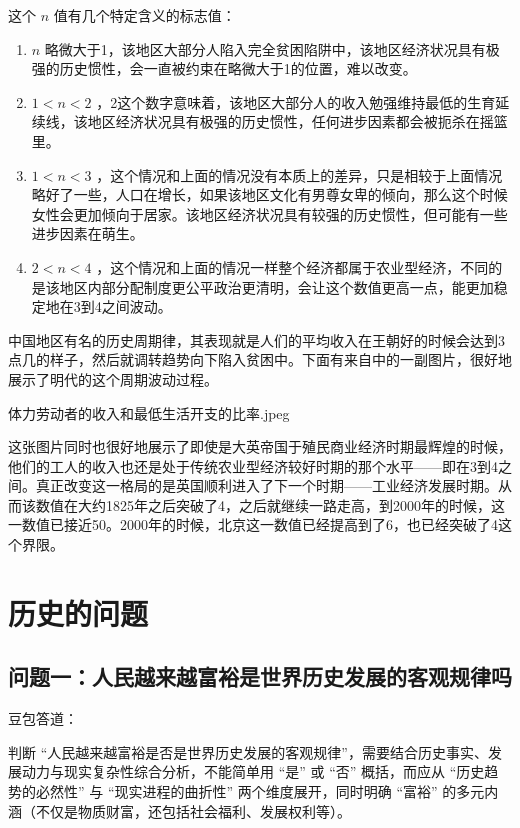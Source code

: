 \documentclass[12pt,oneside]{book}
\begin{document}
这个 $ n $ 值有几个特定含义的标志值：

\begin{enumerate}
\item $ n $ 略微大于1，该地区大部分人陷入完全贫困陷阱中，该地区经济状况具有极强的历史惯性，会一直被约束在略微大于1的位置，难以改变。
\item $ 1< n < 2 $ ，2这个数字意味着，该地区大部分人的收入勉强维持最低的生育延续线，该地区经济状况具有极强的历史惯性，任何进步因素都会被扼杀在摇篮里。
\item $ 1< n < 3 $ ，这个情况和上面的情况没有本质上的差异，只是相较于上面情况略好了一些，人口在增长，如果该地区文化有男尊女卑的倾向，那么这个时候女性会更加倾向于居家。该地区经济状况具有较强的历史惯性，但可能有一些进步因素在萌生。
\item $ 2 <n < 4$ ，这个情况和上面的情况一样整个经济都属于农业型经济，不同的是该地区内部分配制度更公平政治更清明，会让这个数值更高一点，能更加稳定地在3到4之间波动。
\end{enumerate}


中国地区有名的历史周期律，其表现就是人们的平均收入在王朝好的时候会达到3点几的样子，然后就调转趋势向下陷入贫困中。下面有来自\cite{全球经济史}中的一副图片，很好地展示了明代的这个周期波动过程。

\begin{linefig}{体力劳动者的收入和最低生活开支的比率.jpeg}
\caption{体力劳动者的收入和最低生活开支的比率}
\label{fig:体力劳动者的收入和最低生活开支的比率}
\end{linefig}

这张图片同时也很好地展示了即使是大英帝国于殖民商业经济时期最辉煌的时候，他们的工人的收入也还是处于传统农业型经济较好时期的那个水平——即在3到4之间。真正改变这一格局的是英国顺利进入了下一个时期——工业经济发展时期。从而该数值在大约1825年之后突破了4，之后就继续一路走高，到2000年的时候，这一数值已接近50。2000年的时候，北京这一数值已经提高到了6，也已经突破了4这个界限。

\chapter{历史的问题}
\section{问题一：人民越来越富裕是世界历史发展的客观规律吗}
豆包答道：

判断 “人民越来越富裕是否是世界历史发展的客观规律”，需要结合历史事实、发展动力与现实复杂性综合分析，不能简单用 “是” 或 “否” 概括，而应从 “历史趋势的必然性” 与 “现实进程的曲折性” 两个维度展开，同时明确 “富裕” 的多元内涵（不仅是物质财富，还包括社会福利、发展权利等）。
\end{document}

